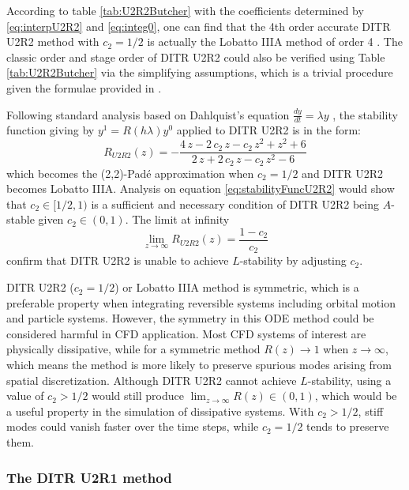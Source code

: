 According to table \ref{tab:U2R2Butcher} with the coefficients
determined by \eqref{eq:interpU2R2} and \eqref{eq:integ0},
one can find that the 4th order accurate
DITR U2R2 method with $c_2=1/2$
is actually the Lobatto IIIA method
of order 4 \cite{wanner1996solving}.
The classic order and stage order of DITR U2R2 could
also be verified using Table \ref{tab:U2R2Butcher} via
the simplifying assumptions, which is a trivial procedure
given the formulae provided in \cite{wanner1996solving}.

Following standard analysis based on Dahlquist's equation
$\frac{dy}{dt} = \lambda y$ \cite{wanner1996solving},
the stability function giving by $y^{1}=R(h\lambda)y^0$
applied to DITR U2R2 is in the form:
\begin{equation}
    \label{eq:stabilityFuncU2R2}
    R_{U2R2}(z) = -\frac{4\,z-2\,c_{2}\,z-c_{2}\,z^2+z^2+6}{2\,z+2\,c_{2}\,z-c_{2}\,z^2-6}
\end{equation}
which becomes the (2,2)-Pad{\'e} approximation when $c_2=1/2$ and
DITR U2R2 becomes Lobatto IIIA.
Analysis on equation \eqref{eq:stabilityFuncU2R2}
would show that $c_2\in[1/2,1)$ is a sufficient and necessary
condition of DITR U2R2 being $A$-stable given $c_2\in(0,1)$.
The limit at infinity
\begin{equation}
    \lim_{z\rightarrow\infty}R_{U2R2}(z) = \frac{1-c_2}{c_2}
\end{equation}
confirm that DITR U2R2 is unable to achieve $L$-stability
by adjusting $c_2$.


DITR U2R2 ($c_2=1/2$) or Lobatto IIIA method is symmetric,
which is a preferable property when integrating
reversible systems including orbital motion and particle
systems.
However,
the symmetry in this ODE method could be considered harmful in CFD application.
Most CFD systems of interest are physically dissipative,
while for a symmetric method
$R(z) \rightarrow 1$ when $z \rightarrow \infty$,
which means the method is more likely to preserve
spurious modes arising from spatial discretization.
Although DITR U2R2 cannot achieve $L$-stability,
using a value of $c_2 > 1/2$ would still
produce $\lim_{z\rightarrow\infty}R(z)\in(0,1)$, which
would be a useful property in the simulation of dissipative systems.
With  $c_2 > 1/2$, stiff modes could vanish faster over the time
steps, while $c_2 = 1/2$ tends to preserve them.

\subsubsection{The DITR U2R1 method}

